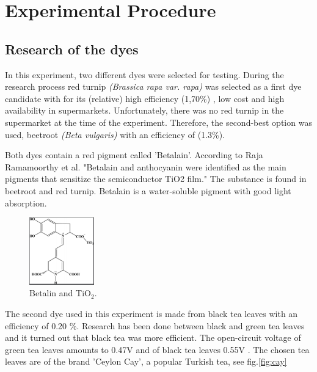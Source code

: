 \documentclass[conference]{IEEEtran}
\begin{document}
\section{Experimental Procedure}

\subsection{Research of the dyes} \label{ResearchDyes}
In this experiment, two different dyes were selected for testing. During the research process red turnip \textit{(Brassica rapa var. rapa)} was selected as a first dye candidate with for its (relative) high efficiency (1,70\%) \cite{redturnipeff}, low cost and high availability in supermarkets. Unfortunately, there was no red turnip in the supermarket at the time of the experiment. Therefore, the second-best option was used, beetroot \textit{(Beta vulgaris)} with an efficiency of (1.3\%). \cite{redbeeteff}

Both dyes contain a red pigment called 'Betalain'. According to Raja Ramamoorthy et al. \cite{betalinpicture} "Betalain and anthocyanin were identified as the
main pigments that sensitize the semiconductor TiO2 film." The substance is found in beetroot and red turnip. Betalain is a water-soluble pigment with good light absorption.\\

\begin{figure}[h]
\centering
\includegraphics[width=0.25\textwidth]{img/Betalin_TiO2.png}
\caption{Betalin and TiO$_2$. \cite{betalinpicture}}
\label{fig:Betalin_TiO2} %
\end{figure}

The second dye used in this experiment is made from black tea leaves with an efficiency of 0.20 \%. Research has been done between black and green tea leaves and it turned out that black tea was more efficient. The open-circuit voltage of green tea leaves amounts to 0.47V and of black tea leaves 0.55V \cite{blacktea} \cite{15naturaldyes}. The chosen tea leaves are of the brand 'Ceylon Cay', a popular Turkish tea, see fig.\ref{fig:cay}
\end{document}
